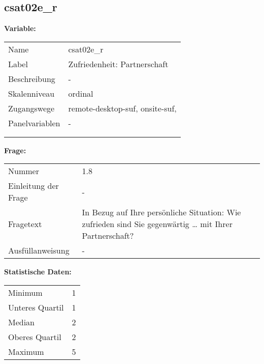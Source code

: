 	
	
	\subsection{csat02e\_r}
	\label{subSection:csat02e_r}

	\noindent\textbf{Variable:}\\
		\begin{tabular}{lL{11.3cm}}
			\label{tableVariable:csat02e_r}
			Name & csat02e\_r \\
			Label & Zufriedenheit: Partnerschaft \\
			Beschreibung & - \\
			Skalenniveau & ordinal \\
			Zugangswege &
				remote-desktop-suf,
				onsite-suf,
 \\
			Panelvariablen & -
			 \\
			 \\
 \\
		\end{tabular}

		\vspace*{1 cm}
		\noindent\textbf{Frage:}\\
		\begin{tabular}{lL{11.3cm}}
			\label{tableQuestion:csat02e_r}
			Nummer & 1.8 \\
			Einleitung der Frage & - \\
			Fragetext & In Bezug auf Ihre persönliche Situation: Wie zufrieden sind Sie gegenwärtig …
mit Ihrer Partnerschaft? \\
			Ausfüllanweisung & - \\
		\end{tabular}


		\vspace*{1 cm}
		\noindent\textbf{Statistische Daten:}\\
			\begin{tabular}{ll}
				\label{tableStatistics:csat02e_r}
					Minimum & 1 \\
					Unteres Quartil & 1 \\
					Median & 2 \\
					Oberes Quartil & 2 \\
					Maximum & 5 \\
			\end{tabular}



